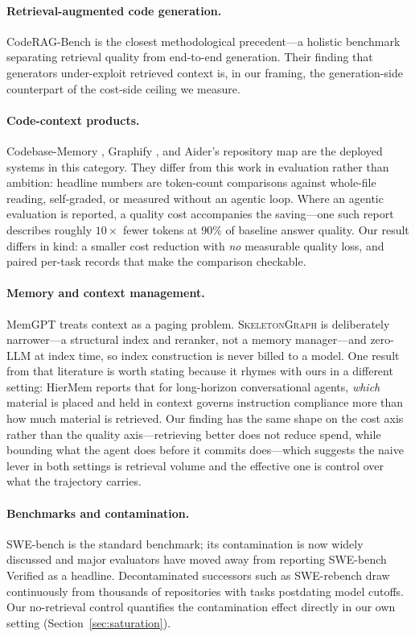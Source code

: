 \documentclass[11pt,letterpaper]{article}
\newcommand{\sg}{\textsc{SkeletonGraph}}
\begin{document}
\paragraph{Retrieval-augmented code generation.}
CodeRAG-Bench \citep{coderagbench} is the closest methodological precedent---a
holistic benchmark separating retrieval quality from end-to-end generation. Their
finding that generators under-exploit retrieved context is, in our framing, the
generation-side counterpart of the cost-side ceiling we measure.

\paragraph{Code-context products.}
Codebase-Memory \citep{cbmem}, Graphify \citep{graphify}, and Aider's repository
map \citep{aider} are the deployed systems in this category. They differ from
this work in evaluation rather than ambition: headline numbers are token-count
comparisons against whole-file reading, self-graded, or measured without an
agentic loop. Where an agentic evaluation is reported, a quality cost accompanies
the saving---one such report describes roughly $10\times$ fewer tokens at 90\% of
baseline answer quality. Our result differs in kind: a smaller cost reduction
with \emph{no} measurable quality loss, and paired per-task records that make the
comparison checkable.

\paragraph{Memory and context management.}
MemGPT \citep{memgpt} treats context as a paging problem. \sg{} is deliberately
narrower---a structural index and reranker, not a memory manager---and zero-LLM
at index time, so index construction is never billed to a model. One result from
that literature is worth stating because it rhymes with ours in a different
setting: HierMem \citep{hiermem} reports that for long-horizon conversational
agents, \emph{which} material is placed and held in context governs instruction
compliance more than how much material is retrieved. Our finding has the same
shape on the cost axis rather than the quality axis---retrieving better does not
reduce spend, while bounding what the agent does before it commits does---which
suggests the naive lever in both settings is retrieval volume and the effective
one is control over what the trajectory carries.

\paragraph{Benchmarks and contamination.}
SWE-bench \citep{swebench} is the standard benchmark; its contamination is now
widely discussed and major evaluators have moved away from reporting SWE-bench
Verified as a headline. Decontaminated successors such as SWE-rebench
\citep{swerebench} draw continuously from thousands of repositories with tasks
postdating model cutoffs. Our no-retrieval control quantifies the contamination
effect directly in our own setting (Section~\ref{sec:saturation}).
\end{document}
